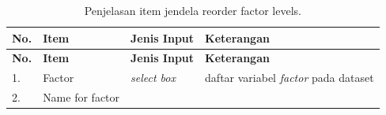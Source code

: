 \documentclass[12pt,]{krantz}
\begin{document}
\begin{longtable}[]{@{}llll@{}}
\caption{\label{tab:reofac} Penjelasan item jendela reorder factor levels.}\tabularnewline
\toprule
\begin{minipage}[b]{0.04\columnwidth}\raggedright
\textbf{No.}\strut
\end{minipage} & \begin{minipage}[b]{0.14\columnwidth}\raggedright
\textbf{Item}\strut
\end{minipage} & \begin{minipage}[b]{0.09\columnwidth}\raggedright
\textbf{Jenis Input}\strut
\end{minipage} & \begin{minipage}[b]{0.61\columnwidth}\raggedright
\textbf{Keterangan}\strut
\end{minipage}\tabularnewline
\midrule
\endfirsthead
\toprule
\begin{minipage}[b]{0.04\columnwidth}\raggedright
\textbf{No.}\strut
\end{minipage} & \begin{minipage}[b]{0.14\columnwidth}\raggedright
\textbf{Item}\strut
\end{minipage} & \begin{minipage}[b]{0.09\columnwidth}\raggedright
\textbf{Jenis Input}\strut
\end{minipage} & \begin{minipage}[b]{0.61\columnwidth}\raggedright
\textbf{Keterangan}\strut
\end{minipage}\tabularnewline
\midrule
\endhead
\begin{minipage}[t]{0.04\columnwidth}\raggedright
1.\strut
\end{minipage} & \begin{minipage}[t]{0.14\columnwidth}\raggedright
Factor\strut
\end{minipage} & \begin{minipage}[t]{0.09\columnwidth}\raggedright
\emph{select box}\strut
\end{minipage} & \begin{minipage}[t]{0.61\columnwidth}\raggedright
daftar variabel \emph{factor} pada dataset\strut
\end{minipage}\tabularnewline
\begin{minipage}[t]{0.04\columnwidth}\raggedright
2.\strut
\end{minipage} & \begin{minipage}[t]{0.14\columnwidth}\raggedright
Name for factor\strut
\end{minipage} & \begin{minipage}[t]{0.09\columnwidth}\raggedright

\end{minipage}
\end{longtable}
\end{document}
